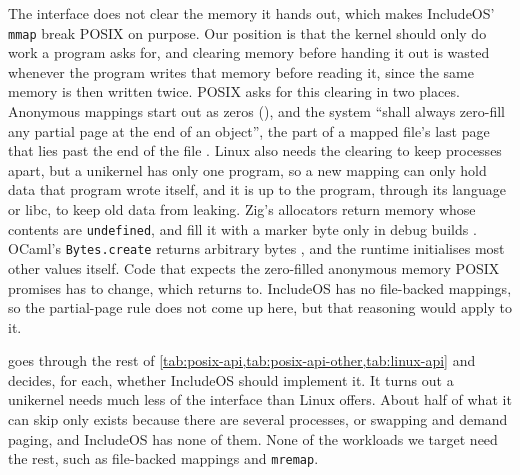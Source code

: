 \documentclass[12pt]{report}
\newcommand{\fullref}[1]{\Cref{#1}}
\renewcommand{\_}{\origunderscore\allowbreak}
\begin{document}
The interface does not clear the memory it hands out, which makes IncludeOS' \texttt{mmap} break POSIX on purpose. Our position is that the kernel should only do work a program asks for, and clearing memory before handing it out is wasted whenever the program writes that memory before reading it, since the same memory is then written twice. POSIX asks for this clearing in two places. Anonymous mappings start out as zeros (\fullref{sssec:posix-memory}), and the system ``shall always zero-fill any partial page at the end of an object'', the part of a mapped file's last page that lies past the end of the file \cite{posix2024mmap}. Linux also needs the clearing to keep processes apart, but a unikernel has only one program, so a new mapping can only hold data that program wrote itself, and it is up to the program, through its language or libc, to keep old data from leaking. Zig's allocators return memory whose contents are \texttt{undefined}, and fill it with a marker byte only in debug builds \cite{zig-allocator-source,zig-langref}. OCaml's \texttt{Bytes.create} returns arbitrary bytes \cite{ocaml-bytes}, and the runtime initialises most other values itself. Code that expects the zero-filled anonymous memory POSIX promises has to change, which \fullref{sec:discussion-results} returns to. IncludeOS has no file-backed mappings, so the partial-page rule does not come up here, but that reasoning would apply to it.

 goes through the rest of \cref{tab:posix-api,tab:posix-api-other,tab:linux-api} and decides, for each, whether IncludeOS should implement it. It turns out a unikernel needs much less of the interface than Linux offers. About half of what it can skip only exists because there are several processes, or swapping and demand paging, and IncludeOS has none of them. None of the workloads we target need the rest, such as file-backed mappings and \texttt{mremap}.
\end{document}
